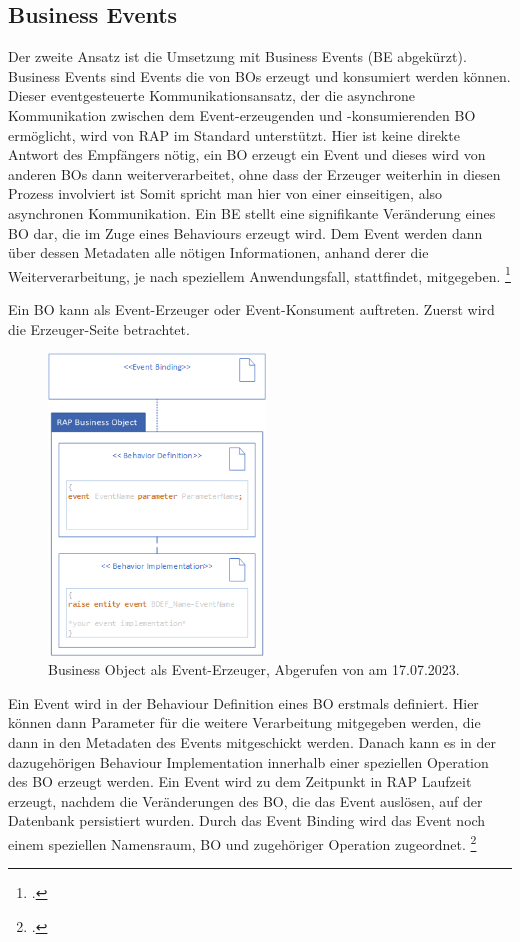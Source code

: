 \subsection{Business Events}

Der zweite Ansatz ist die Umsetzung mit Business Events (BE abgekürzt). Business Events sind Events die von BOs erzeugt und konsumiert werden können. Dieser eventgesteuerte Kommunikationsansatz, der die asynchrone Kommunikation zwischen dem Event-erzeugenden und -konsumierenden BO ermöglicht, wird von RAP im Standard unterstützt. Hier ist keine direkte Antwort des Empfängers nötig, ein BO erzeugt ein Event und dieses wird von anderen BOs dann weiterverarbeitet, ohne dass der Erzeuger weiterhin in diesen Prozess involviert ist Somit spricht man hier von einer einseitigen, also asynchronen Kommunikation. 
Ein BE stellt eine signifikante Veränderung eines BO dar, die im Zuge eines Behaviours erzeugt wird. Dem Event werden dann über dessen Metadaten alle nötigen Informationen, anhand derer die Weiterverarbeitung, je nach speziellem Anwendungsfall, stattfindet, mitgegeben. \footcite[Vgl.][]{sap_business-events_2023}

Ein BO kann als Event-Erzeuger oder Event-Konsument auftreten. Zuerst wird die Erzeuger-Seite betrachtet.

\begin{figure}[H]
    \centering
    \includegraphics[height=8cm]{Bilder/Business-Events_BO-as-event-consumer.png}
    \caption[Business Object als Event-Erzeuger]{Business Object als Event-Erzeuger, Abgerufen von \cite{sap_business-events_2023} am 17.07.2023.}
    \label{fig:iso_norm}
\end{figure}

Ein Event wird in der Behaviour Definition eines BO erstmals definiert. Hier können dann Parameter für die weitere Verarbeitung mitgegeben werden, die dann in den Metadaten des Events mitgeschickt werden. Danach kann es in der dazugehörigen Behaviour Implementation innerhalb einer speziellen Operation des BO erzeugt werden. Ein Event wird zu dem Zeitpunkt in RAP Laufzeit erzeugt, nachdem die Veränderungen des BO, die das Event auslösen, auf der Datenbank persistiert wurden. Durch das Event Binding wird das Event noch einem speziellen Namensraum, BO und zugehöriger Operation zugeordnet. \footcite[Vgl.][]{sap_business-events_2023}

